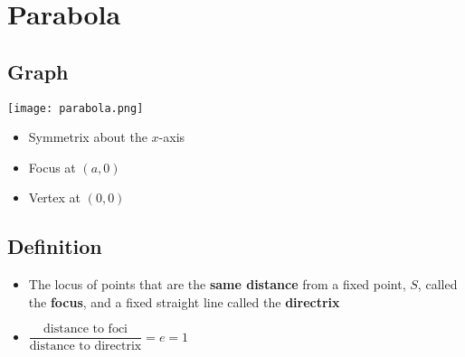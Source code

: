 


\section{Parabola}
\subsection{Graph}
\texttt{[image: parabola.png]}
\begin{itemize}
    \item Symmetrix about the $x$-axis
    \item Focus at $(a, 0)$
    \item Vertex at $(0, 0)$
\end{itemize}
\subsection{Definition}
\begin{itemize}
    \item The locus of points that are the \textbf{same distance} from a fixed point, $S$,
          called the \textbf{focus}, and a fixed straight line called the \textbf{directrix}
    \item $\dfrac{\text{distance to foci}}{\text{distance to directrix}} = e = 1$
\end{itemize}

